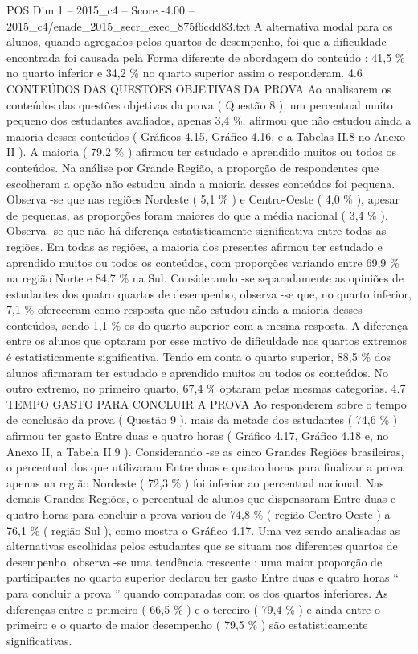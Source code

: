 \begin{textsample}{POS Dim 1 – 2015\_c4 – Score -4.00 – 2015\_c4/enade\_2015\_secr\_exec\_875f6cdd83.txt}
A alternativa modal para os alunos, quando agregados pelos quartos de desempenho, foi que a dificuldade encontrada foi causada pela Forma diferente de abordagem do conteúdo : 41,5 \% no quarto inferior e 34,2 \% no quarto superior assim o responderam. 4.6 CONTEÚDOS DAS QUESTÕES OBJETIVAS DA PROVA Ao analisarem os conteúdos das questões objetivas da prova ( Questão 8 ), um percentual muito pequeno dos estudantes avaliados, apenas 3,4 \%, afirmou que não estudou ainda a maioria desses conteúdos ( Gráficos 4.15, Gráfico 4.16, e a Tabelas II.8 no Anexo II ).
A maioria ( 79,2 \% ) afirmou ter estudado e aprendido muitos ou todos os conteúdos.
Na análise por Grande Região, a proporção de respondentes que escolheram a opção não estudou ainda a maioria desses conteúdos foi pequena.
Observa -se que nas regiões Nordeste ( 5,1 \% ) e Centro-Oeste ( 4,0 \% ), apesar de pequenas, as proporções foram maiores do que a média nacional ( 3,4 \% ).
Observa -se que não há diferença estatisticamente significativa entre todas as regiões.
Em todas as regiões, a maioria dos presentes afirmou ter estudado e aprendido muitos ou todos os conteúdos, com proporções variando entre 69,9 \% na região Norte e 84,7 \% na Sul.
Considerando -se separadamente as opiniões de estudantes dos quatro quartos de desempenho, observa -se que, no quarto inferior, 7,1 \% ofereceram como resposta que não estudou ainda a maioria desses conteúdos, sendo 1,1 \% os do quarto superior com a mesma resposta.
A diferença entre os alunos que optaram por esse motivo de dificuldade nos quartos extremos é estatisticamente significativa.
Tendo em conta o quarto superior, 88,5 \% dos alunos afirmaram ter estudado e aprendido muitos ou todos os conteúdos.
No outro extremo, no primeiro quarto, 67,4 \% optaram pelas mesmas categorias. 4.7 TEMPO GASTO PARA CONCLUIR A PROVA Ao responderem sobre o tempo de conclusão da prova ( Questão 9 ), mais da metade dos estudantes ( 74,6 \% ) afirmou ter gasto Entre duas e quatro horas ( Gráfico 4.17, Gráfico 4.18 e, no Anexo II, a Tabela II.9 ).
Considerando -se as cinco Grandes Regiões brasileiras, o percentual dos que utilizaram Entre duas e quatro horas para finalizar a prova apenas na região Nordeste ( 72,3 \% ) foi inferior ao percentual nacional.
Nas demais Grandes Regiões, o percentual de alunos que dispensaram Entre duas e quatro horas para concluir a prova variou de 74,8 \% ( região Centro-Oeste ) a 76,1 \% ( região Sul ), como mostra o Gráfico 4.17.
Uma vez sendo analisadas as alternativas escolhidas pelos estudantes que se situam nos diferentes quartos de desempenho, observa -se uma tendência crescente : uma maior proporção de participantes no quarto superior declarou ter gasto Entre duas e quatro horas “ para concluir a prova ” quando comparadas com os dos quartos inferiores.
As diferenças entre o primeiro ( 66,5 \% ) e o terceiro ( 79,4 \% ) e ainda entre o primeiro e o quarto de maior desempenho ( 79,5 \% ) são estatisticamente significativas.

\end{textsample}

